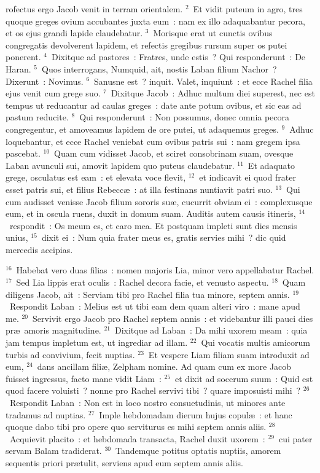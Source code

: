 \bchapter
{}rofectus ergo Jacob venit in terram orientalem.
${}^{2}$~Et vidit puteum in agro, tres quoque greges ovium accubantes juxta eum~: nam ex illo adaquabantur pecora, et os ejus grandi lapide claudebatur.
${}^{3}$~Morisque erat ut cunctis ovibus congregatis devolverent lapidem, et refectis gregibus rursum super os putei ponerent.
${}^{4}$~Dixitque ad pastores~: Fratres, unde estis~? Qui responderunt~: De Haran.
${}^{5}$~Quos interrogans, Numquid, ait, nostis Laban filium Nachor~? Dixerunt~: Novimus.
${}^{6}$~Sanusne est~? inquit. Valet, inquiunt~: et ecce Rachel filia ejus venit cum grege suo.
${}^{7}$~Dixitque Jacob~: Adhuc multum diei superest, nec est tempus ut reducantur ad caulas greges~: date ante potum ovibus, et sic eas ad pastum reducite.
${}^{8}$~Qui responderunt~: Non possumus, donec omnia pecora congregentur, et amoveamus lapidem de ore putei, ut adaquemus greges.
${}^{9}$~Adhuc loquebantur, et ecce Rachel veniebat cum ovibus patris sui~: nam gregem ipsa pascebat.
${}^{10}$~Quam cum vidisset Jacob, et sciret consobrinam suam, ovesque Laban avunculi sui, amovit lapidem quo puteus claudebatur.
${}^{11}$~Et adaquato grege, osculatus est eam~: et elevata voce flevit,
${}^{12}$~et indicavit ei quod frater esset patris sui, et filius Rebecc\ae~: at illa festinans nuntiavit patri suo.
${}^{13}$~Qui cum audisset venisse Jacob filium sororis su\ae , cucurrit obviam ei~: complexusque eum, et in oscula ruens, duxit in domum suam. Auditis autem causis itineris,
${}^{14}$~respondit~: Os meum es, et caro mea. Et postquam impleti sunt dies mensis unius,
${}^{15}$~dixit ei~: Num quia frater meus es, gratis servies mihi~? dic quid mercedis accipias.


${}^{16}$~Habebat vero duas filias~: nomen majoris Lia, minor vero appellabatur Rachel.
${}^{17}$~Sed Lia lippis erat oculis~: Rachel decora facie, et venusto aspectu.
${}^{18}$~Quam diligens Jacob, ait~: Serviam tibi pro Rachel filia tua minore, septem annis.
${}^{19}$~Respondit Laban~: Melius est ut tibi eam dem quam alteri viro~: mane apud me.
${}^{20}$~Servivit ergo Jacob pro Rachel septem annis~: et videbantur illi pauci dies pr\ae\ amoris magnitudine.
${}^{21}$~Dixitque ad Laban~: Da mihi uxorem meam~: quia jam tempus impletum est, ut ingrediar ad illam.
${}^{22}$~Qui vocatis multis amicorum turbis ad convivium, fecit nuptias.
${}^{23}$~Et vespere Liam filiam suam introduxit ad eum,
${}^{24}$~dans ancillam fili\ae , Zelpham nomine. Ad quam cum ex more Jacob fuisset ingressus, facto mane vidit Liam~:
${}^{25}$~et dixit ad socerum suum~: Quid est quod facere voluisti~? nonne pro Rachel servivi tibi~? quare imposuisti mihi~?
${}^{26}$~Respondit Laban~: Non est in loco nostro consuetudinis, ut minores ante tradamus ad nuptias.
${}^{27}$~Imple hebdomadam dierum hujus copul\ae~: et hanc quoque dabo tibi pro opere quo serviturus es mihi septem annis aliis.
${}^{28}$~Acquievit placito~: et hebdomada transacta, Rachel duxit uxorem~:
${}^{29}$~cui pater servam Balam tradiderat.
${}^{30}$~Tandemque potitus optatis nuptiis, amorem sequentis priori pr\ae tulit, serviens apud eum septem annis aliis.


